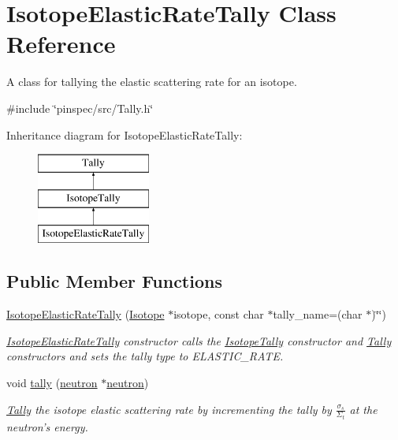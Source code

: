 \hypertarget{classIsotopeElasticRateTally}{\section{Isotope\-Elastic\-Rate\-Tally Class Reference}
\label{classIsotopeElasticRateTally}
}


A class for tallying the elastic scattering rate for an isotope.  




{\ttfamily \#include \char`\"{}pinspec/src/\-Tally.\-h\char`\"{}}

Inheritance diagram for Isotope\-Elastic\-Rate\-Tally\-:\begin{figure}[H]
\begin{center}
\leavevmode
\includegraphics[height=3.000000cm]{classIsotopeElasticRateTally}
\end{center}
\end{figure}
\subsection*{Public Member Functions}
\begin{DoxyCompactItemize}
\item 
\hyperlink{classIsotopeElasticRateTally_a4f590fce6ac4136240fb5ddadfbcc3c0}{Isotope\-Elastic\-Rate\-Tally} (\hyperlink{classIsotope}{Isotope} $\ast$isotope, const char $\ast$tally\-\_\-name=(char $\ast$)\char`\"{}\char`\"{})
\begin{DoxyCompactList}\small\item\em \hyperlink{classIsotopeElasticRateTally}{Isotope\-Elastic\-Rate\-Tally} constructor calls the \hyperlink{classIsotopeTally}{Isotope\-Tally} constructor and \hyperlink{classTally}{Tally} constructors and sets the tally type to E\-L\-A\-S\-T\-I\-C\-\_\-\-R\-A\-T\-E. \end{DoxyCompactList}\item 
void \hyperlink{classIsotopeElasticRateTally_a641673a78be89eec1f1be4d424f0e078}{tally} (\hyperlink{structneutron}{neutron} $\ast$\hyperlink{structneutron}{neutron})
\begin{DoxyCompactList}\small\item\em \hyperlink{classTally}{Tally} the isotope elastic scattering rate by incrementing the tally by $ \frac{\sigma_s}{\Sigma_t} $ at the neutron's energy. \end{DoxyCompactList}\end{DoxyCompactItemize}
